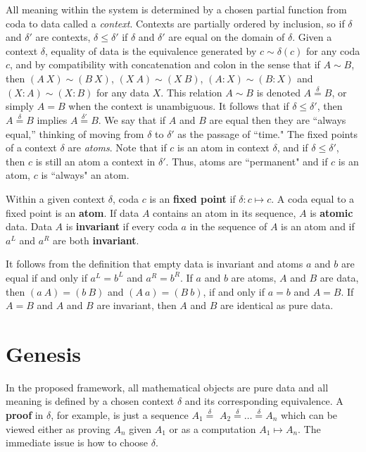 \documentclass[11pt]{article}
\begin{document}
     All meaning within the system is determined by a chosen partial function from coda to data called a {\it context}. 
Contexts are partially ordered by inclusion, so if $\delta$ and $\delta'$ are contexts, $\delta\le\delta'$ if $\delta$ and $\delta'$ are equal on the domain of $\delta$.  
Given a context $\delta$, equality of data is the equivalence generated by $c\sim \delta(c)$ for any coda $c$, and by compatibility with concatenation and colon in the sense that 
if $A\sim B$, then $(A\ X)\sim (B\ X)$, $(X\ A)\sim (X\ B)$, $(A:X)\sim (B:X)$ and $(X:A)\sim(X:B)$ for any data $X$.  This relation $A\sim B$ is denoted $A{\overset\delta =}B$, 
or simply $A=B$ when the context is unambiguous.   
It follows that if $\delta\leq\delta'$, then $A{\overset\delta =}B$ implies $A{\overset{\delta'} =}B$.  We say that if $A$ and $B$ are equal then they are ``always equal,'' thinking 
of moving from $\delta$ to $\delta'$ as the passage of ``time."  The fixed points of a context $\delta$ are {\it atoms}.  Note that if $c$ is an atom in context $\delta$, 
and if $\delta\leq\delta'$, then $c$ is still an atom a context in $\delta'$.  Thus, atoms are ``permanent" and if $c$ is an atom, $c$ is ``always" an atom.  

\begin{definition}
{Within a given context $\delta$, coda $c$ is an {\bf fixed point} if $\delta:c\mapsto c$.  A coda equal to a fixed point is an {\bf atom}.  If data $A$ contains an atom in its sequence, $A$ is {\bf atomic} data. 
Data $A$ is {\bf invariant} if every coda $a$ in the sequence of $A$ is an atom and if $a^L$ and $a^R$ are both {\bf invariant}. }
\end{definition}
\noindent It follows from the definition that empty data is invariant and atoms $a$ and $b$ are equal if and only if $a^L=b^L$ and $a^R=b^R$.  If $a$ and $b$ are atoms, 
$A$ and $B$ are data, then $(a\ A)=(b\ B)$ and $(A\ a)=(B\ b)$, if and only if $a=b$ and $A=B$.  If $A=B$ and $A$ and $B$ are invariant, then $A$ and 
$B$ are identical as pure data.

\section{Genesis}

    In the proposed framework, all mathematical objects are pure data and all meaning is defined by a chosen context $\delta$ and its corresponding equivalence.  
A {\bf proof} in $\delta$, for example, is just a sequence $A_1{\overset \delta =}$ $A_2 {\overset \delta =} \dots {\overset \delta =}$$A_n$ which can be viewed either as proving $A_n$ 
given $A_1$ or as a computation $A_1\mapsto A_n$. 
The immediate issue is how to choose $\delta$.  
    
\end{document}
